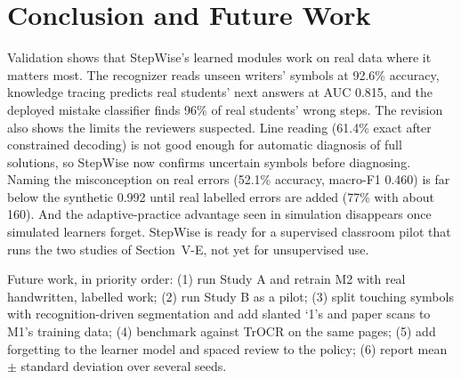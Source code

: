\documentclass[conference]{IEEEtran}
\begin{document}
\section{Conclusion and Future Work}
Validation shows that StepWise's learned modules work on real data where it matters most. The recognizer reads unseen writers' symbols at 92.6\% accuracy, knowledge tracing predicts real students' next answers at AUC 0.815, and the deployed mistake classifier finds 96\% of real students' wrong steps. The revision also shows the limits the reviewers suspected. Line reading (61.4\% exact after constrained decoding) is not good enough for automatic diagnosis of full solutions, so StepWise now confirms uncertain symbols before diagnosing. Naming the misconception on real errors (52.1\% accuracy, macro-F1 0.460) is far below the synthetic 0.992 until real labelled errors are added (77\% with about 160). And the adaptive-practice advantage seen in simulation disappears once simulated learners forget. StepWise is ready for a supervised classroom pilot that runs the two studies of Section~V-E, not yet for unsupervised use.

Future work, in priority order: (1) run Study A and retrain M2 with real handwritten, labelled work; (2) run Study B as a pilot; (3) split touching symbols with recognition-driven segmentation and add slanted `1's and paper scans to M1's training data; (4) benchmark against TrOCR \cite{trocr} on the same pages; (5) add forgetting to the learner model and spaced review to the policy; (6) report mean $\pm$ standard deviation over several seeds.
\end{document}
